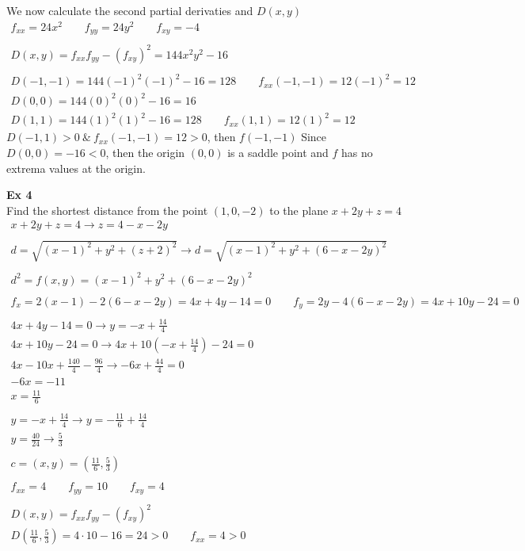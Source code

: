 \documentclass{article}
\begin{document}
    We now calculate the second partial derivaties and $ D(x,y) $
    \[
      \begin{gathered}
      f_{xx}=24x^{2} \qquad f_{yy}=24y^{2} \qquad f_{xy}=-4\\
      ~\\
      D(x,y)=f_{xx}f_{yy}-(f_{xy})^{2}=144x^{2}y^{2}-16\\
      ~\\
      D(-1,-1)=144(-1)^{2}(-1)^{2}-16=128 \qquad f_{xx}(-1,-1)=12(-1)^{2}=12\\
      D(0,0)=144(0)^{2}(0)^{2}-16 = 16\\
      D(1,1)=144(1)^{2}(1)^{2}-16 = 128 \qquad f_{xx}(1,1)=12(1)^{2}=12
      \end{gathered}
    \]
    $ D(-1,1) >0 ~\&~ f_{xx}(-1,-1)=12>0 $, then $ f(-1,-1) $  Since $ D(0,0)=-16<0$, then the origin $ (0,0) $ is a saddle point and $ f $ has no extrema values at the origin.

    \textbf{Ex 4}\\
    Find the shortest distance from the point $ (1,0,-2) $ to the plane $ x+2y+z=4 $
    \[
      \begin{gathered}
      x+2y+z=4 \to z=4-x-2y\\
      ~\\
      d=\sqrt{(x-1)^{2}+y^{2}+(z+2)^{2}} \to d=\sqrt{(x-1)^{2}+y^{2}+(6-x-2y)^{2}}\\
      ~\\
      d^{2}=f(x,y)=(x-1)^{2}+y^{2}+(6-x-2y)^{2}\\
      ~\\
      f_x=2(x-1)-2(6-x-2y)=4x+4y-14=0 \qquad f_y=2y-4(6-x-2y)=4x+10y-24=0\\
      ~\\
      4x+4y-14 = 0 \to y=-x+\frac{14}{4}\\
      4x+10y-24=0 \to 4x+10(-x+\frac{14}{4})-24=0\\
      4x-10x+\frac{140}{4}-\frac{96}{4}\to -6x+\frac{44}{4}=0\\
      -6x=-11\\
      x=\frac{11}{6}\\
      ~\\
      y=-x+\frac{14}{4}\to y=-\frac{11}{6}+\frac{14}{4}\\
      y=\frac{40}{24}\to \frac{5}{3}\\
      ~\\
      c=(x,y)=(\frac{11}{6},\frac{5}{3})\\
      ~\\
      f_{xx}=4 \qquad f_{yy}=10 \qquad f_{xy}=4\\
      ~\\
      D(x,y)=f_{xx}f_{yy}-(f_{xy})^{2}\\
      D(\frac{11}{6},\frac{5}{3} ) = 4\cdot 10 - 16=24>0 \qquad f_{xx}=4>0   
      \end{gathered}
    \]
\end{document}
